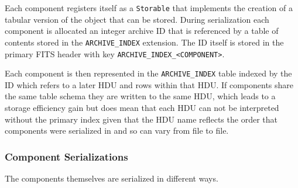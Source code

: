 Each component registers itself as a \texttt{Storable} that implements the creation of a tabular version of the object that can be stored.
During serialization each component is allocated an integer archive ID that is referenced by a table of contents stored in the \texttt{ARCHIVE\_INDEX} extension.
The ID itself is stored in the primary FITS header with key \texttt{ARCHIVE\_INDEX\_<COMPONENT>}.

Each component is then represented in the \texttt{ARCHIVE\_INDEX} table indexed by the ID which refers to a later HDU and rows within that HDU.
If components share the same table schema they are written to the same HDU, which leads to a storage efficiency gain but does mean that each HDU can not be interpreted without the primary index given that the HDU name reflects the order that components were serialized in and so can vary from file to file.

\subsubsection{Component Serializations}

The components themselves are serialized in different ways.

